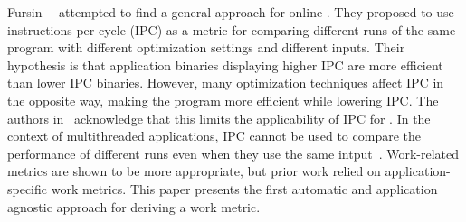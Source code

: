 Fursin~\etal~\cite{fursin07} attempted to find a general approach for online \itercomp. They proposed to use instructions per cycle (IPC)
as a metric for comparing different runs of the same program with different optimization settings and different inputs. Their hypothesis is
that application binaries displaying higher IPC are more efficient than lower IPC binaries. However, many optimization techniques affect
IPC in the opposite way, making the program more efficient while lowering IPC. The authors in~\cite{fursin07} acknowledge that this limits
the applicability of IPC for \itercomp. In the context of multithreaded applications, IPC cannot be used to compare the performance of
different runs even when they use the same intput~\cite{alameldeen06,eyerman08}. Work-related metrics are shown to be more appropriate, but prior work
relied on application-specific work metrics. This paper presents the first automatic and application agnostic approach for deriving a work metric.





